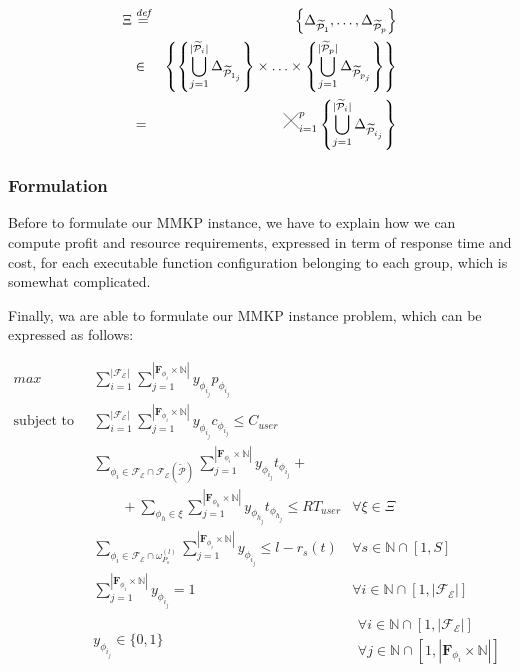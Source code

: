 \documentclass[12pt,a4paper]{report}
\newcommand{\Cross}{\mathbin{\tikz [x=2.5ex,y=2.5ex,line width=.10ex] \draw (0,0) -- (1,1) (0,1) -- (1,0);}}
\newcommand{\mathDef}{\overset{\textit{def}}{=}}
\newcommand{\N}{\mathbb{N}}
\begin{document}
\begin{eqnarray}
	\Xi & \mathDef & \left\lbrace \Delta_{\mathcal{\widetilde{P}}_{1}}, \ldots, \Delta_{\mathcal{\widetilde{P}}_{p}} \right\rbrace \nonumber \\ 
	& \in & \left\{  \left\{ \bigcup_{j=1}^{|\mathcal{\widetilde{P}}_i|} \Delta_{\mathcal{\widetilde{P}}_{1_j}} \right\} \times \ldots \times \left\{ \bigcup_{j=1}^{|\mathcal{\widetilde{P}}_p|} \Delta_{\mathcal{\widetilde{P}}_{p_j}} \right\} \right\}  \nonumber \\
	& = & \Cross_{i = 1}^p  \left\{ \bigcup_{j=1}^{|\mathcal{\widetilde{P}}_i|} \Delta_{\mathcal{\widetilde{P}}_{i_j}} \right\}  \nonumber \\
\end{eqnarray}

\subsubsection{Formulation}


Before to formulate our MMKP instance, we have to explain how we can compute profit and resource requirements, expressed in term of response time and cost, for each executable function configuration belonging to each group, which is somewhat complicated.

Finally, wa are able to formulate our MMKP instance problem, which can be expressed as follows:

\begin{align}
	\label{MMKP}
	\displaystyle max \quad & \displaystyle \sum_{i = 1}^{|\mathscr{F_E}|}  \sum_{j = 1}^{|\textbf{F}_{\phi_{i}} \times \N|} y_{\phi_{i_{j}}} p_{\phi_{i_{j}}} & \\	
	\text{subject to} \quad  & \displaystyle \sum_{i = 1}^{|\mathscr{F_E}|}  \sum_{j = 1}^{|\textbf{F}_{\phi_{i}} \times \N|} y_{\phi_{i_{j}}} c_{\phi_{i_{j}}} \leq C_{user} & \\
	& \displaystyle \sum_{\phi_i \in \mathscr{F_E} \cap \mathscr{F_E}(\mathcal{\widetilde{P}})}  \sum_{j = 1}^{|\textbf{F}_{\phi_{i}} \times \N|} y_{\phi_{i_{j}}} t_{\phi_{i_{j}}} + \nonumber \\
	& \qquad + \sum_{\phi_h \in \xi}  \sum_{j = 1}^{|\textbf{F}_{\phi_{h}} \times \N|} y_{\phi_{h_{j}}} t_{\phi_{h_{j}}} \leq RT_{user} & 
	\forall \xi \in \Xi \\	
	& \displaystyle \sum_{\phi_i \in \mathscr{F_E} \cap \omega_{P_s}^{(l)}} \sum_{j = 1}^{|\textbf{F}_{\phi_{i}} \times \N|} y_{\phi_{i_{j}}} \leq l - r_s(t) & \forall s \in \N \cap \left[ 1, S \right] \\
	& \displaystyle \sum_{j = 1}^{|\textbf{F}_{\phi_{i}} \times \N|} y_{\phi_{i_{j}}} = 1 & \forall i \in \N \cap \left[ 1, |\mathscr{F_E}| \right] \\
	& y_{\phi_{i_{j}}} \in \lbrace 0, 1 \rbrace &
	\begin{array}{r}
		\forall i \in \N \cap \left[ 1, |\mathscr{F_E}| \right] \\ \forall j \in \N \cap [1,|\textbf{F}_{\phi_{i}} \times \N|]
	\end{array}
\end{align}
\end{document}
